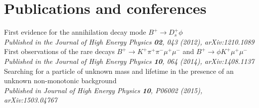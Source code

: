 \section{Publications and conferences}

{
  First evidence for the annihilation decay mode $B^+\!\to D_s^+\phi$ \\
  \textit{Published in the Journal of High Energy Physics \textbf{02}, 043 (2012),
arXiv:1210.1089}
}
{
First observations of the rare decays
  $B^+\!\to K^+\pi^+\pi^-\mu^+\mu^-$ and
  $B^+\!\to\phi K^+\mu^+\mu^-$ \\
  \textit{Published in the Journal of High Energy Physics \textbf{10}, 064 (2014), arXiv:1408.1137}
}
{
  Searching for a particle of unknown mass and lifetime in the presence of an
  unknown non-monotonic background \\
  \textit{Published in Journal of High Energy Physics \textbf{10}, P06002 (2015), arXiv:1503.04767}
}









